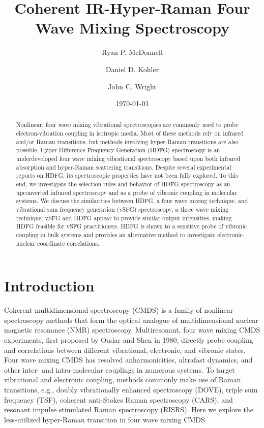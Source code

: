 \documentclass[aip, jcp, reprint, onecolumn, nofootinbib]{revtex4-2}
\begin{document}
\title{Coherent IR-Hyper-Raman Four Wave Mixing Spectroscopy}


\author{Ryan P. McDonnell} %
\author{Daniel D. Kohler}
\author{John C. Wright} 


\date{\today}

\begin{abstract}
Nonlinear, four wave mixing vibrational spectroscopies are commonly used to probe electron-vibration coupling in isotropic media.
Most of these methods rely on infrared and/or Raman transitions, but methods involving hyper-Raman transitions are also possible. 
Hyper Difference Frequency Generation (HDFG) spectroscopy is an underdeveloped four wave mixing vibrational spectroscopy based upon both infrared absorption and hyper-Raman scattering transitions. 
Despite several experimental reports on HDFG, its spectroscopic properties have not been fully explored. 
To this end, we investigate the selection rules and behavior of HDFG spectroscopy as an upconverted infrared spectroscopy and as a probe of vibronic coupling in molecular systems.
We discuss the similarities between HDFG, a four wave mixing technique, and vibrational sum frequency generation (vSFG) spectroscopy, a three wave mixing technique. 
vSFG and HDFG appear to provide similar output intensities, making HDFG feasible for vSFG practitioners.
HDFG is shown to a sensitive probe of vibronic coupling in bulk systems and provides an alternative method to investigate electronic-nuclear coordinate correlations.
\end{abstract}

\maketitle

\section{Introduction}
Coherent multidimensional spectroscopy (CMDS) is a family of nonlinear spectroscopy methods that form the optical analogue of multidimensional nuclear magnetic resonance (NMR) spectroscopy.\cite{Cho2008}
Multiresonant, four wave mixing CMDS experiments, first proposed by Oudar and Shen in 1980,\cite{RN307} directly probe coupling and correlations between different vibrational, electronic, and vibronic states. \cite{RN281, RN103, Cho2008} 
Four wave mixing CMDS has resolved anharmonicities, ultrafast dynamics, and other inter- and intra-molecular couplings in numerous systems. \cite{Cho2008, Gaynor2017, Ziegler2018, Ogilvie2019, Bonn2021, RN325, Chen2024}
To target vibrational and electronic coupling, methods commonly make use of Raman transitions, e.g., doubly vibrationally enhanced spectroscopy (DOVE), triple sum frequency (TSF), coherent anti-Stokes Raman spectroscopy (CARS), and resonant impulse stimulated Raman spectroscopy (RISRS).\cite{RN103, Dhar1994, RN345, Cho2000, RN491}
Here we explore the less-utilized hyper-Raman transition in four wave mixing CMDS.
\end{document}
